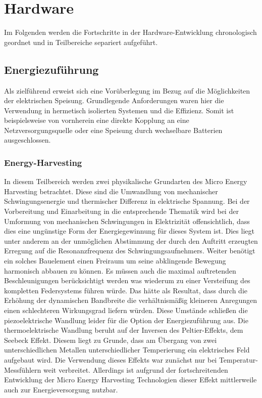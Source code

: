 \documentclass[12pt]{scrreprt} %
\begin{document}
\chapter{Hardware}
Im Folgenden werden die Fortschritte in der Hardware-Entwicklung chronologisch geordnet und in Teilbereiche separiert aufgeführt.
\section{Energiezuführung}
Als zielführend erweist sich eine Vorüberlegung im Bezug auf die Möglichkeiten der elektrischen Speisung. Grundlegende Anforderungen waren hier die Verwendung in hermetisch isolierten Systemen und die Effizienz. Somit ist beispielsweise von vornherein eine direkte Kopplung an eine Netzversorgungsquelle oder eine Speisung durch wechselbare Batterien ausgeschlossen. 
\subsection{Energy-Harvesting}
In diesem Teilbereich werden zwei physikalische Grundarten des Micro Energy Harvesting betrachtet. Diese sind die Umwandlung von mechanischer Schwingungsenergie und thermischer Differenz in elektrische Spannung. Bei der Vorbereitung und Einarbeitung in die entsprechende Thematik wird bei der Umformung von mechanischen Schwingungen in Elektrizität offensichtlich, dass dies eine ungünstige Form der Energiegewinnung für dieses System ist. Dies liegt unter anderem an der unmöglichen Abstimmung der durch den Auftritt erzeugten Erregung auf die Resonanzfrequenz des Schwingungsaufnehmers. Weiter benötigt ein solches Bauelement einen Freiraum um seine abklingende Bewegung harmonisch abbauen zu können. Es müssen auch die maximal auftretenden Beschleunigungen berücksichtigt werden was wiederum zu einer Versteifung des kompletten Federsystems führen würde. Das hätte als Resultat, dass durch die Erhöhung der dynamischen Bandbreite die verhältnismäßig kleineren Anregungen einen schlechteren Wirkungsgrad liefern würden. Diese Umstände schließen die piezoelektrische Wandlung leider für die Option der Energiezuführung aus. \citep[vgl. S.39]{Dembowski2011} \newline 
Die thermoelektrische Wandlung beruht auf der Inversen des Peltier-Effekts, dem Seebeck Effekt. Diesem liegt zu Grunde, dass am Übergang von zwei unterschiedlichen Metallen unterschiedlicher Temperierung ein elektrisches Feld aufgebaut wird. Die Verwendung dieses Effekts war zunächst nur bei Temperatur-Messfühlern weit verbreitet. Allerdings ist aufgrund der fortschreitenden Entwicklung der Micro Energy Harvesting Technologien dieser Effekt mittlerweile auch zur Energieversorgung nutzbar. \newline \newline
\end{document}
